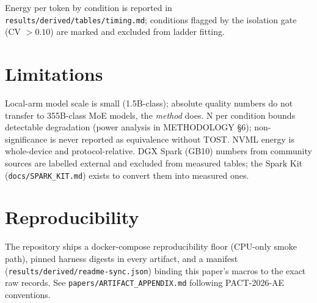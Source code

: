 \documentclass[sigconf, nonacm]{acmart}
\begin{document}
Energy per token by condition is reported in
\texttt{results/derived/tables/timing.md}; conditions flagged by the
isolation gate (CV $>0.10$) are marked and excluded from ladder fitting.

\section{Limitations}
Local-arm model scale is small (1.5B-class); absolute quality numbers do not
transfer to 355B-class MoE models, the \emph{method} does. N per condition
bounds detectable degradation (power analysis in METHODOLOGY \S6);
non-significance is never reported as equivalence without TOST. NVML energy
is whole-device and protocol-relative. DGX Spark (GB10) numbers from
community sources are labelled external and excluded from measured tables;
the Spark Kit (\texttt{docs/SPARK\_KIT.md}) exists to convert them into
measured ones.

\section{Reproducibility}
The repository ships a docker-compose reproducibility floor (CPU-only smoke
path), pinned harness digests in every artifact, and a manifest
(\texttt{results/derived/readme-sync.json}) binding this paper's macros to
the exact raw records. See \texttt{papers/ARTIFACT\_APPENDIX.md} following
PACT-2026-AE conventions.



\end{document}

